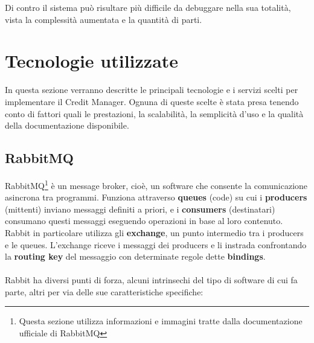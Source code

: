 Di contro il sistema pu\`o risultare pi\`u difficile da debuggare nella sua totalit\`a, vista la complessit\`a aumentata e la quantit\`a di parti.

\section{Tecnologie utilizzate}
In questa sezione verranno descritte le principali tecnologie e i servizi scelti per implementare il Credit Manager.
Ognuna di queste scelte \`e stata presa tenendo conto di fattori quali le prestazioni, la scalabilit\`a, la semplicit\`a d'uso e la qualit\`a della documentazione disponibile.

\subsection{RabbitMQ}
RabbitMQ\footnote{Questa sezione utilizza informazioni e immagini tratte dalla documentazione ufficiale di RabbitMQ\cite{rabbitmq}}
\`e un message broker, cio\`e, un software che consente la comunicazione asincrona tra programmi.
Funziona attraverso \textbf{queues} (code) su cui i \textbf{producers} (mittenti) inviano messaggi definiti a priori,
e i \textbf{consumers} (destinatari) consumano questi messaggi eseguendo operazioni in base al loro contenuto.
Rabbit in particolare utilizza gli \textbf{exchange}, un punto intermedio tra i producers e le queues.
L'exchange riceve i messaggi dei producers e li instrada confrontando la \textbf{routing key} del messaggio con determinate regole dette \textbf{bindings}.
\\\\
Rabbit ha diversi punti di forza, alcuni intrinsechi del tipo di software di cui fa parte, altri per via delle sue caratteristiche specifiche:\
